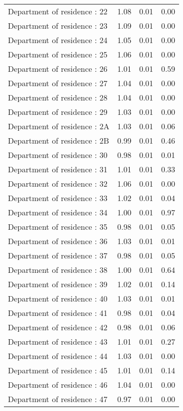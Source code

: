 \documentclass{article}
\begin{document}
\begin{longtable}{lrrr}
Department of residence : 22 & 1.08 & 0.01 & 0.00 \\ 
Department of residence : 23 & 1.09 & 0.01 & 0.00 \\ 
Department of residence : 24 & 1.05 & 0.01 & 0.00 \\ 
Department of residence : 25 & 1.06 & 0.01 & 0.00 \\ 
Department of residence : 26 & 1.01 & 0.01 & 0.59 \\ 
Department of residence : 27 & 1.04 & 0.01 & 0.00 \\ 
Department of residence : 28 & 1.04 & 0.01 & 0.00 \\ 
Department of residence : 29 & 1.03 & 0.01 & 0.00 \\ 
Department of residence : 2A & 1.03 & 0.01 & 0.06 \\ 
Department of residence : 2B & 0.99 & 0.01 & 0.46 \\ 
Department of residence : 30 & 0.98 & 0.01 & 0.01 \\ 
Department of residence : 31 & 1.01 & 0.01 & 0.33 \\ 
Department of residence : 32 & 1.06 & 0.01 & 0.00 \\ 
Department of residence : 33 & 1.02 & 0.01 & 0.04 \\ 
Department of residence : 34 & 1.00 & 0.01 & 0.97 \\ 
Department of residence : 35 & 0.98 & 0.01 & 0.05 \\ 
Department of residence : 36 & 1.03 & 0.01 & 0.01 \\ 
Department of residence : 37 & 0.98 & 0.01 & 0.05 \\ 
Department of residence : 38 & 1.00 & 0.01 & 0.64 \\ 
Department of residence : 39 & 1.02 & 0.01 & 0.14 \\ 
Department of residence : 40 & 1.03 & 0.01 & 0.01 \\ 
Department of residence : 41 & 0.98 & 0.01 & 0.04 \\ 
Department of residence : 42 & 0.98 & 0.01 & 0.06 \\ 
Department of residence : 43 & 1.01 & 0.01 & 0.27 \\ 
Department of residence : 44 & 1.03 & 0.01 & 0.00 \\ 
Department of residence : 45 & 1.01 & 0.01 & 0.14 \\ 
Department of residence : 46 & 1.04 & 0.01 & 0.00 \\ 
Department of residence : 47 & 0.97 & 0.01 & 0.00 \\ 

\end{longtable}
\end{document}
